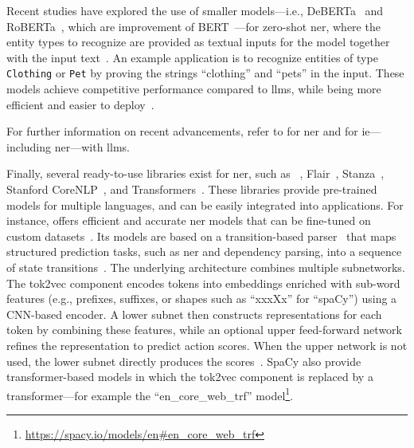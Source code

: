 Recent studies have explored the use of smaller models---i.e., DeBERTa~\cite{HeGChen2023} and RoBERTa~\cite{liu2020roberta}, which are improvement of BERT~\cite{devlin-etal-2019-bert}---for zero-shot \ac{ner}, where the entity types to recognize are provided as textual inputs for the model together with the input text~\cite{zaratiana-etal-2024-gliner,bogdanov-etal-2024-nuner}. An example application is to recognize entities of type \texttt{Clothing} or \texttt{Pet} by proving the strings ``clothing'' and ``pets'' in the input. These models achieve competitive performance compared to \acp{llm}, while being more efficient and easier to deploy~\cite{zaratiana-etal-2024-gliner,bogdanov-etal-2024-nuner}.


For further information on recent advancements, refer to \textcite{keraghel2024recentadvancesnamedentity} for \ac{ner} and \textcite{xu2024llm_for_ie} for \ac{ie}---including \ac{ner}---with \acp{llm}.


Finally, several ready-to-use libraries exist for \ac{ner}, such as \spacy~\cite{honnibal2020spacy}, Flair~\cite{akbik2019flair}, Stanza~\cite{qi2020stanza}, Stanford CoreNLP~\cite{manning-EtAl:2014:P14-5}, and Transformers~\cite{wolf-etal-2020-transformers}. These libraries provide pre-trained models for multiple languages, and can be easily integrated into applications. For instance, \spacy offers efficient and accurate \ac{ner} models that can be fine-tuned on custom datasets~\cite{honnibal2020spacy}. Its models are based on a transition-based parser~\cite{AliEtAl2023UnintendedMemorization} that maps structured prediction tasks, such as \ac{ner} and dependency parsing, into a sequence of state transitions~\cite{lample-etal-2016-neural}. The underlying architecture combines multiple subnetworks. The tok2vec component encodes tokens into embeddings enriched with sub-word features (e.g., prefixes, suffixes, or shapes such as ``xxxXx'' for ``spaCy'') using a CNN-based encoder. A lower subnet then constructs representations for each token by combining these features, while an optional upper feed-forward network refines the representation to predict action scores. When the upper network is not used, the lower subnet directly produces the scores~\cite{AliEtAl2023UnintendedMemorization}. SpaCy also provide transformer-based models in which the tok2vec component is replaced by a transformer---for example the ``en\_core\_web\_trf'' model\footnote{\url{https://spacy.io/models/en\#en\_core\_web\_trf}}.





